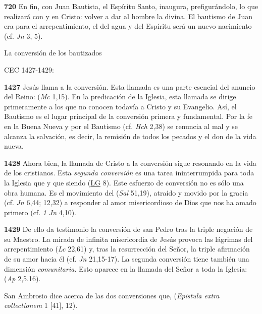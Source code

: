 \textbf{720} En fin, con Juan Bautista, el Espíritu Santo, inaugura, prefigurándolo, lo que realizará con y en Cristo: volver a dar al hombre la  divina. El bautismo de Juan era para el arrepentimiento, el del agua y del Espíritu será un nuevo nacimiento (cf. \emph{Jn} 3, 5).

La conversión de los bautizados

CEC 1427-1429:

\textbf{1427} Jesús llama a la conversión. Esta llamada es una parte esencial del anuncio del Reino:  (\emph{Mc} 1,15). En la predicación de la Iglesia, esta llamada se dirige primeramente a los que no conocen todavía a Cristo y su Evangelio. Así, el Bautismo es el lugar principal de la conversión primera y fundamental. Por la fe en la Buena Nueva y por el Bautismo (cf. \emph{Hch} 2,38) se renuncia al mal y se alcanza la salvación, es decir, la remisión de todos los pecados y el don de la vida nueva.

\textbf{1428} Ahora bien, la llamada de Cristo a la conversión sigue resonando en la vida de los cristianos. Esta \emph{segunda conversión} es una tarea ininterrumpida para toda la Iglesia que  y que siendo  (\href{http://www.vatican.va/archive/hist_councils/ii_vatican_council/documents/vat-ii_const_19641121_lumen-gentium_sp.html}{LG} 8). Este esfuerzo de conversión no es sólo una obra humana. Es el movimiento del  (\emph{Sal} 51,19), atraído y movido por la gracia (cf. \emph{Jn} 6,44; 12,32) a responder al amor misericordioso de Dios que nos ha amado primero (cf. \emph{1 Jn} 4,10).

\textbf{1429} De ello da testimonio la conversión de san Pedro tras la triple negación de su Maestro. La mirada de infinita misericordia de Jesús provoca las lágrimas del arrepentimiento (\emph{Lc} 22,61) y, tras la resurrección del Señor, la triple afirmación de su amor hacia él (cf. \emph{Jn} 21,15-17). La segunda conversión tiene también una dimensión \emph{comunitaria}. Esto aparece en la llamada del Señor a toda la Iglesia:  (\emph{Ap} 2,5.16).

San Ambrosio dice acerca de las dos conversiones que,  (\emph{Epistula extra collectionem} 1 {[}41{]}, 12).

